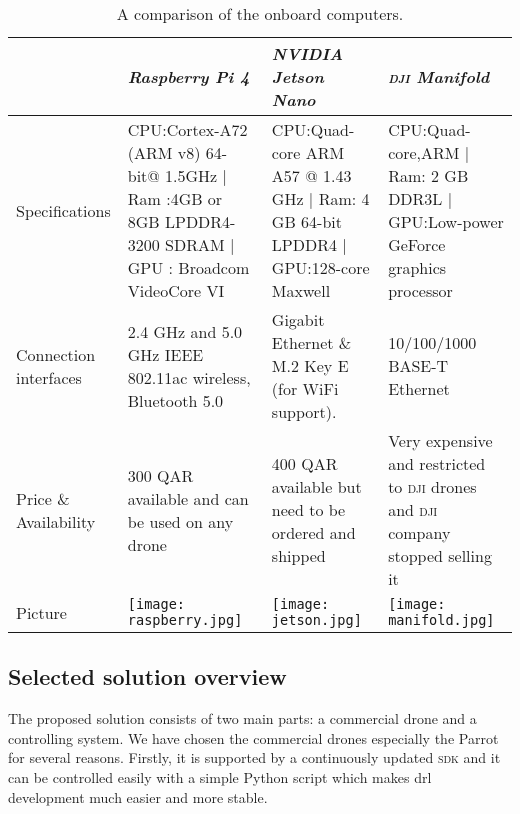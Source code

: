\documentclass[../main.tex]{subfiles}
\begin{document}
\begin{table}[bt]
    \centering
    \caption{A comparison of the onboard computers.}
    \label{tab:onboard-computers}  
    \begin{tabular}{ p{3cm} p{4cm} p{4cm} p{4cm} }
        \toprule
        \textit{} & \textit{Raspberry Pi 4} & \textit{NVIDIA Jetson Nano} & \textit{\textsc{dji} Manifold}\\ \midrule
        Specifications  & CPU:Cortex-A72 (ARM v8) 64-bit@ 1.5GHz | Ram :4GB or 8GB LPDDR4-3200 SDRAM | GPU : Broadcom VideoCore VI & CPU:Quad-core ARM A57 @ 1.43 GHz | Ram: 4 GB 64-bit LPDDR4   | GPU:128-core Maxwell & CPU:Quad-core,ARM | Ram: 2 GB DDR3L | GPU:Low-power GeForce graphics processor \\ \addlinespace
        Connection interfaces & 2.4 GHz and 5.0 GHz IEEE 802.11ac wireless, Bluetooth 5.0 & Gigabit Ethernet \& M.2 Key E (for WiFi support). &10/100/1000 BASE-T Ethernet \\ \addlinespace

        Price \& Availability & 300 QAR available and can be used on any drone & 400 QAR available but need to be ordered and shipped & Very expensive and restricted to \textsc{dji} drones and \textsc{dji} company stopped selling it \\ \addlinespace
        Picture & \begin{minipage}{.2\textwidth}
            \texttt{[image: raspberry.jpg]}
            \end{minipage}  & \begin{minipage}{.2\textwidth}
            \texttt{[image: jetson.jpg]}
            \end{minipage} & \begin{minipage}{.2\textwidth}
            \texttt{[image: manifold.jpg]}
        \end{minipage} \\
        \bottomrule
        \end{tabular}
    \end{table}

\subsection{Selected solution overview}\label{sec:selected-solution}

The proposed solution consists of two main parts: 
a commercial drone and a controlling system.
We have chosen the commercial drones especially 
the Parrot \anafi for several reasons.
Firstly, it is supported by a continuously updated 
\textsc{sdk} and it can be controlled easily 
with a simple Python script which makes 
\gls{drl} development much easier and more stable. 
\end{document}
